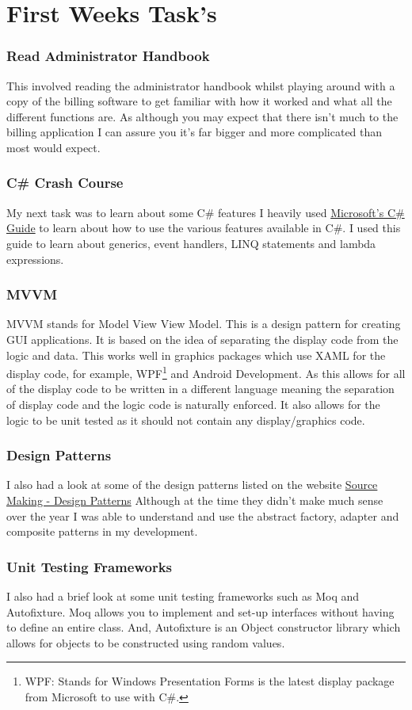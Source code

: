 \section{First Weeks Task's}{
	\subsubsection*{Read Administrator Handbook}{
		This involved reading the administrator handbook whilst playing around with a copy of the billing software to get familiar with how it worked and what all the different functions are. As although you may expect that there isn't much to the billing application I can assure you it's far bigger and more complicated than most would expect.
	}
	\subsubsection*{C\# Crash Course}{
		My next task was to learn about some C\# features I heavily used \href{https://docs.microsoft.com/en-gb/dotnet/csharp/programming-guide/}{Microsoft's C\# Guide}\cite{CSProgrammingGuide2017} to learn about how to use the various features available in C\#. I used this guide to learn about generics, event handlers, LINQ statements and lambda expressions.
	}
	\subsubsection*{MVVM}{
		MVVM stands for Model View View Model. This is a design pattern for creating GUI applications. It is based on the idea of separating the display code from the logic and data. This works well in graphics packages which use XAML for the display code, for example, WPF\footnote{WPF: Stands for Windows Presentation Forms is the latest display package from Microsoft to use with C\#.} and Android Development. As this allows for all of the display code to be written in a different language meaning the separation of display code and the logic code is naturally enforced. It also allows for the logic to be unit tested as it should not contain any display/graphics code.
	}
	\subsubsection*{Design Patterns}{
		I also had a look at some of the design patterns listed on the website \href{https://sourcemaking.com/design_patterns}{Source Making - Design Patterns} \cite{DesignPatterns2007} Although at the time they didn't make much sense over the year I was able to understand and use the abstract factory, adapter and composite patterns in my development.
	}
	\subsubsection*{Unit Testing Frameworks}{
		I also had a brief look at some unit testing frameworks such as Moq and Autofixture. Moq allows you to implement and set-up interfaces without having to define an entire class. And, Autofixture is an Object constructor library which allows for objects to be constructed using random values.
	}
}